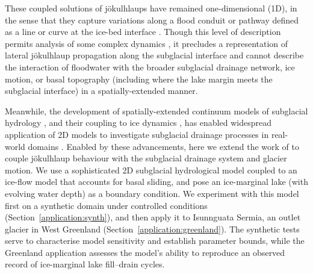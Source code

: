 \documentclass[tc, manuscript]{copernicus}
\begin{document}
These coupled solutions of jökulhlaups have remained one-dimensional (1D), in the sense that they capture variations along a flood conduit or pathway defined as a line or curve at the ice-bed interface \citep[e.g.,][]{fowler1999breaking,kingslake2013modelling}. Though this level of description permits analysis of some complex dynamics \citep{kingslake2015chaotic,stubblefield2019modeling,schoof2020analysis}, it precludes a representation of lateral jökulhlaup propagation along the subglacial interface \citep{kingslake2013modelling} and cannot describe the interaction of floodwater with the broader subglacial drainage network, ice motion, or basal topography (including where the lake margin meets the subglacial interface) in a spatially-extended manner. 

Meanwhile, the development of spatially-extended continuum models of subglacial hydrology \citep[e.g.,][]{werder2013modeling,sommers2018shakti}, and their coupling to ice dynamics \citep{gilbert2022consistent,cook2022fully,pelle2024subglacial}, has enabled widespread application of 2D models to investigate subglacial drainage processes in real-world domains \citep[e.g.,][]{dow2019role,ehrenfeucht2023seasonal,ehrenfeucht2025Antarctic,narayanan2025simulating}. Enabled by these advancements, here we extend the work of \citet{kingslake2013modelling} to couple jökulhlaup behaviour with the subglacial drainage system and glacier motion. We use a sophisticated 2D subglacial hydrological model coupled to an ice-flow model that accounts for basal sliding, and pose an ice-marginal lake (with evolving water depth) as a boundary condition. We experiment with this model first on a synthetic domain under controlled conditions (Section~\ref{application:synth}), and then apply it to Isunnguata Sermia, an outlet glacier in West Greenland (Section~\ref{application:greenland}). The synthetic tests serve to characterise model sensitivity and establish parameter bounds, while the Greenland application assesses the model's ability to reproduce an observed record of ice-marginal lake fill--drain cycles.
\end{document}

